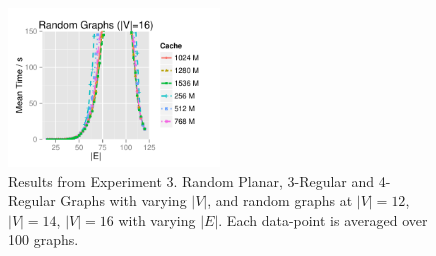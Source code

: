 \begin{figure}[!p]
\includegraphics[width=0.5\textwidth]{data/Exp3_random16_graphs.pdf}
\caption{Results from Experiment 3.  Random Planar, 3-Regular and 4-Regular Graphs with varying $|V|$, and random graphs at $|V|= 12$, $|V|= 14$, $|V|= 16$ with varying $|E|$.  Each data-point is averaged over 100 graphs.}
\label{experiment_3}
\end{figure}
